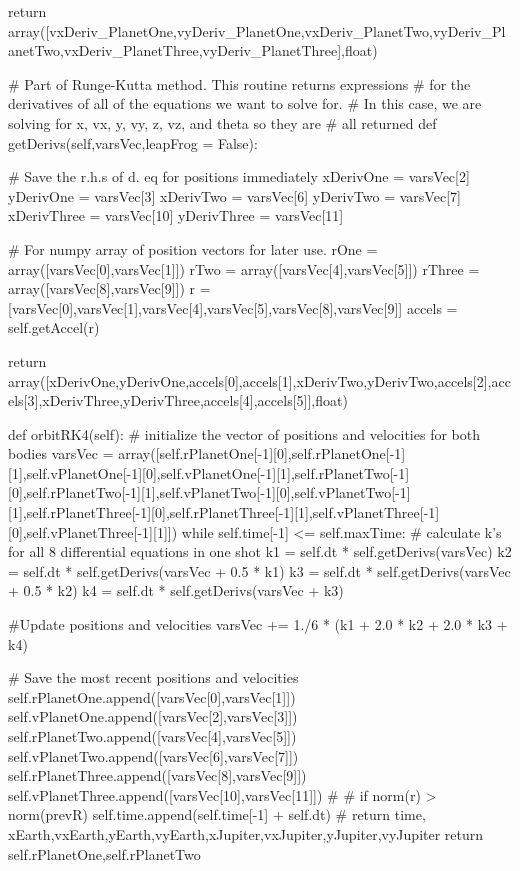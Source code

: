 \begin{enumerate}
\begin{codeexample}
\begin{VerbatimOut}{\listingFile}
        
        return array([vxDeriv_PlanetOne,vyDeriv_PlanetOne,vxDeriv_PlanetTwo,vyDeriv_PlanetTwo,vxDeriv_PlanetThree,vyDeriv_PlanetThree],float)


        
    # Part of Runge-Kutta method.  This routine returns expressions
    # for the derivatives of all of the equations we want to solve for.
    # In this case, we are solving for x, vx, y, vy, z, vz, and theta so they are
    # all returned
    def getDerivs(self,varsVec,leapFrog = False):


        # Save the r.h.s of d. eq for positions immediately
        xDerivOne = varsVec[2]
        yDerivOne = varsVec[3]
        xDerivTwo = varsVec[6]
        yDerivTwo = varsVec[7]
        xDerivThree = varsVec[10]
        yDerivThree = varsVec[11]


        # For numpy array of position vectors for later use.
        rOne = array([varsVec[0],varsVec[1]])
        rTwo = array([varsVec[4],varsVec[5]])
        rThree = array([varsVec[8],varsVec[9]])
        r = [varsVec[0],varsVec[1],varsVec[4],varsVec[5],varsVec[8],varsVec[9]]
        accels = self.getAccel(r)

        return array([xDerivOne,yDerivOne,accels[0],accels[1],xDerivTwo,yDerivTwo,accels[2],accels[3],xDerivThree,yDerivThree,accels[4],accels[5]],float)
        

    def orbitRK4(self):
        # initialize the vector of positions and velocities for both bodies
        varsVec = array([self.rPlanetOne[-1][0],self.rPlanetOne[-1][1],self.vPlanetOne[-1][0],self.vPlanetOne[-1][1],self.rPlanetTwo[-1][0],self.rPlanetTwo[-1][1],self.vPlanetTwo[-1][0],self.vPlanetTwo[-1][1],self.rPlanetThree[-1][0],self.rPlanetThree[-1][1],self.vPlanetThree[-1][0],self.vPlanetThree[-1][1]])
        while self.time[-1] <= self.maxTime:
            # calculate k's for all 8 differential equations in one shot
            k1 = self.dt * self.getDerivs(varsVec)
            k2 = self.dt * self.getDerivs(varsVec + 0.5 * k1)
            k3 = self.dt * self.getDerivs(varsVec + 0.5 * k2)
            k4 = self.dt * self.getDerivs(varsVec + k3)
            
            #Update positions and velocities
            varsVec += 1./6 * (k1 + 2.0 * k2 + 2.0 * k3 + k4)

            # Save the most recent positions and velocities
            self.rPlanetOne.append([varsVec[0],varsVec[1]])
            self.vPlanetOne.append([varsVec[2],varsVec[3]])
            self.rPlanetTwo.append([varsVec[4],varsVec[5]])
            self.vPlanetTwo.append([varsVec[6],varsVec[7]])
            self.rPlanetThree.append([varsVec[8],varsVec[9]])
            self.vPlanetThree.append([varsVec[10],varsVec[11]])
            #       
            #        if norm(r) > norm(prevR)
            self.time.append(self.time[-1] + self.dt)
            #        return time, xEarth,vxEarth,yEarth,vyEarth,xJupiter,vxJupiter,yJupiter,vyJupiter
        return self.rPlanetOne,self.rPlanetTwo


\end{VerbatimOut}
\end{codeexample}
\end{enumerate}
